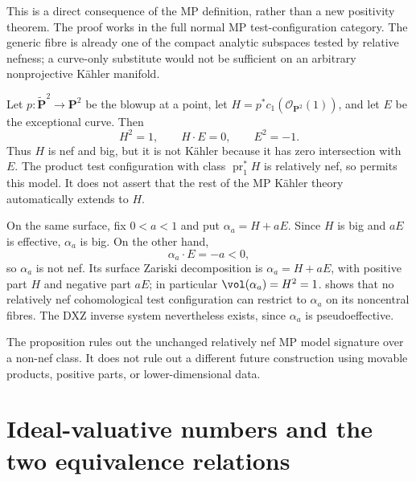 This is a direct consequence of the MP definition, rather than a new
positivity theorem.  The proof works in the full normal MP
test-configuration category.  The
generic fibre is already one of the compact analytic subspaces tested by
relative nefness; a curve-only substitute would not be sufficient on an
arbitrary nonprojective K\"ahler manifold.

\begin{example}\label{ex:pseff-nef-big}
Let $p:\widetilde{\mathbf P}^2\to\mathbf P^2$ be the blowup at a point,
let $H=p^*c_1(\mathcal O_{\mathbf P^2}(1))$, and let $E$ be the
exceptional curve.  Then
\[
                         H^2=1,\qquad H\cdot E=0,
                         \qquad E^2=-1.
\tag{71.4}\label{eq:pseff-blowup-intersections}
\]
Thus $H$ is nef and big, but it is not K\"ahler because it has zero
intersection with $E$.  The product test configuration with class
$\operatorname{pr}_1^*H$ is relatively nef, so
 permits this model.  It does not
assert that the rest of the MP K\"ahler theory automatically extends to
$H$.
\end{example}

\begin{example}\label{ex:pseff-big-nonnef}
On the same surface, fix $0<a<1$ and put
$\alpha_a=H+aE$.  Since $H$ is big and $aE$ is effective,
$\alpha_a$ is big.  On the other hand,
\[
                         \alpha_a\cdot E=-a<0,
\tag{71.5}\label{eq:pseff-big-nonnef-intersection}
\]
so $\alpha_a$ is not nef.  Its surface Zariski decomposition is
$\alpha_a=H+aE$, with positive part $H$ and negative part $aE$;
in particular $\vol(\alpha_a)=H^2=1$.
 shows that no relatively nef
cohomological test configuration can restrict to $\alpha_a$ on its
noncentral fibres.  The DXZ inverse system nevertheless exists, since
$\alpha_a$ is pseudoeffective.
\end{example}

\begin{remark}\label{rem:pseff-obstruction-scope}
The proposition rules out the unchanged relatively nef MP model signature
over a non-nef class.  It does not rule out a different future construction
using movable products, positive parts, or lower-dimensional data.
\end{remark}

\section{Ideal-valuative numbers and the two equivalence relations}
\label{sec:pseff-ideal-values}

